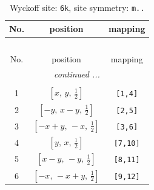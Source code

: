 \documentclass[fleqn,8pt]{jsarticle}
\begin{document}
\renewcommand{\arraystretch}{1.2}
\begin{longtable}{ccc}
\caption{Wyckoff site: {\tt 6k}, site symmetry: {\tt m..}}
 \\
 \hline \hline
No. & position & mapping \\ \hline \endfirsthead

\multicolumn{2}{l}{\tablename\ \thetable{}} \\
 \hline \hline
No. & position & mapping \\ \hline \endhead

 \hline \hline
\multicolumn{2}{r}{\footnotesize\it continued ...} \\ \endfoot

 \hline \hline
\multicolumn{2}{r}{} \\ \endlastfoot

1 & $\left[ x,\, y,\, \frac{1}{2} \right]$ & {\tt [1,4]} \\ \hline
2 & $\left[ - y,\, x - y,\, \frac{1}{2} \right]$ & {\tt [2,5]} \\ \hline
3 & $\left[ - x + y,\, - x,\, \frac{1}{2} \right]$ & {\tt [3,6]} \\ \hline
4 & $\left[ y,\, x,\, \frac{1}{2} \right]$ & {\tt [7,10]} \\ \hline
5 & $\left[ x - y,\, - y,\, \frac{1}{2} \right]$ & {\tt [8,11]} \\ \hline
6 & $\left[ - x,\, - x + y,\, \frac{1}{2} \right]$ & {\tt [9,12]} \\
\end{longtable}
\renewcommand{\arraystretch}{1.2}
\end{document}
